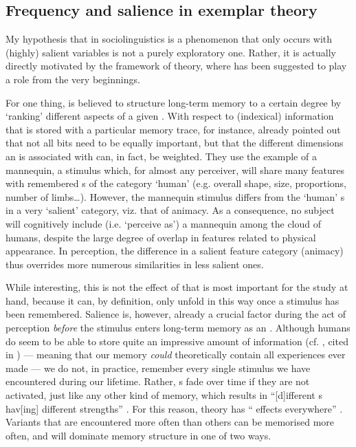 		\subsection{Frequency and salience in exemplar theory}
		\label{sec.sal.exemplar.freq}
		
My hypothesis that   in sociolinguistics is a phenomenon that only occurs with (highly) salient variables is not a purely exploratory one.
Rather, it is actually directly motivated by the framework of  theory, where  has been suggested to play a role from the very beginnings.

For one thing,  is believed to structure long-term memory to a certain degree by `ranking' different aspects of a given .
With respect to (indexical) information that is stored with a particular memory trace, for instance, \textcite[cf.][210--212]{medinschaffer1978} already pointed out that not all bits need to be equally important, but that the different dimensions an  is associated with can, in fact, be weighted.
They use the example of a mannequin, a stimulus which, for almost any perceiver, will share many features with remembered s of the category `human' (e.g. overall shape, size, proportions, number of limbs\ldots).
However, the mannequin stimulus differs from the `human' s in a very `salient' category, viz. that of animacy.
As a consequence, no subject will cognitively include (i.e. `perceive as') a mannequin among the  cloud of humans, despite the large degree of overlap in features related to physical appearance.
In perception, the difference in a salient feature category (animacy) thus overrides more numerous similarities in less salient ones.

While interesting, this is not the effect of  that is most important for the study at hand, because it can, by definition, only unfold in this way once a stimulus has been remembered.
Salience is, however, already a crucial factor during the act of perception \emph{before} the stimulus enters long-term memory as an .
Although humans do seem to be able to store quite an impressive amount of information (cf. \citealt{johnson2005}, cited in \citealt[44]{racz2013}) --- meaning that our memory \emph{could} theoretically contain all experiences ever made --- we do not, in practice, remember every single stimulus we have encountered during our lifetime.
Rather, s fade over time if they are not activated, just like any other kind of memory, which results in ``[d]ifferent s hav[ing] different strengths'' \parencite[cf.][115]{pierrehumbert2002}.
For this reason,  theory has `` effects everywhere'' \parencite[524]{pierrehumbert2006}.
Variants that are encountered more often than others can be memorised more often, and will dominate memory structure in one of two ways.

